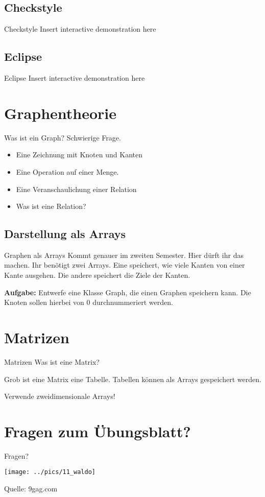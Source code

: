 \documentclass[18pt]{beamer}
\begin{document}
\subsection{Checkstyle}
\begin{frame}{Checkstyle}
 Insert interactive demonstration here
\end{frame}
\subsection{Eclipse}
\begin{frame}{Eclipse}
 Insert interactive demonstration here
\end{frame}
\section{Graphentheorie}
\begin{frame}{Was ist ein Graph?}
 Schwierige Frage.
 \begin{itemize}
  \item Eine Zeichnung mit Knoten und Kanten \pause
  \item Eine Operation auf einer Menge. \pause
  \item Eine Veranschaulichung einer Relation \pause
  \item Was ist eine Relation?
 \end{itemize}
\end{frame}

\subsection{Darstellung als Arrays}
\begin{frame}{Graphen als Arrays}
Kommt genauer im zweiten Semester. Hier dürft ihr das machen.
Ihr benötigt zwei Arrays. Eine speichert, wie viele Kanten von einer
Kante ausgehen. Die andere speichert die Ziele der Kanten.

\textbf{Aufgabe:} Entwerfe eine Klasse Graph, die einen Graphen speichern
kann. Die Knoten sollen hierbei von 0 durchnummeriert werden.
\end{frame}

\section{Matrizen}
\begin{frame}{Matrizen}
 Was ist eine Matrix? \pause
 
 Grob ist eine Matrix eine Tabelle. 
 Tabellen können als Arrays gespeichert werden. 
 
 \pause
 Verwende zweidimensionale Arrays!
\end{frame}

\section{Fragen zum Übungsblatt?}
\begin{frame}{Fragen?}
\end{frame}



\begin{frame}
 \texttt{[image: ../pics/11\_waldo]}
 
 \tiny{Quelle: 9gag.com}
\end{frame}
\end{document}
